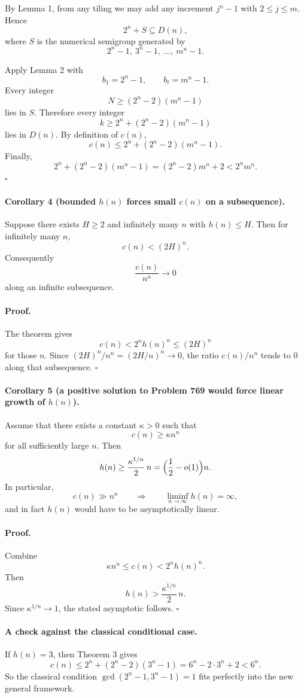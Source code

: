 By Lemma 1, from any tiling we may add any increment $j^n-1$ with $2\le j\le m$.
Hence
\[
2^n+S\subseteq D(n),
\]
where $S$ is the numerical semigroup generated by
\[
2^n-1,\ 3^n-1,\ \dots,\ m^n-1.
\]

Apply Lemma 2 with
\[
b_1=2^n-1,\qquad b_t=m^n-1.
\]
Every integer
\[
N\ge (2^n-2)(m^n-1)
\]
lies in $S$.
Therefore every integer
\[
k\ge 2^n+(2^n-2)(m^n-1)
\]
lies in $D(n)$.
By definition of $c(n)$,
\[
c(n)\le 2^n+(2^n-2)(m^n-1).
\]
Finally,
\[
2^n+(2^n-2)(m^n-1)
=
(2^n-2)m^n+2
<
2^n m^n.
\]
\hfill$\square$

\paragraph{Corollary 4 (bounded $h(n)$ forces small $c(n)$ on a subsequence).}
Suppose there exists $H\ge 2$ and infinitely many $n$ with $h(n)\le H$.
Then for infinitely many $n$,
\[
c(n)<(2H)^n.
\]
Consequently
\[
\frac{c(n)}{n^n}\to 0
\]
along an infinite subsequence.

\paragraph{Proof.}
The theorem gives
\[
c(n)<2^n h(n)^n\le (2H)^n
\]
for those $n$.
Since $(2H)^n/n^n=(2H/n)^n\to 0$, the ratio $c(n)/n^n$ tends to $0$ along that subsequence.
\hfill$\square$

\paragraph{Corollary 5 (a positive solution to Problem 769 would force linear growth of $h(n)$).}
Assume that there exists a constant $\kappa>0$ such that
\[
c(n)\ge \kappa n^n
\]
for all sufficiently large $n$.
Then
\[
h(n)\ge \frac{\kappa^{1/n}}{2}\,n
=
\Bigl(\frac12-o(1)\Bigr)n.
\]
In particular,
\[
c(n)\gg n^n
\qquad\Longrightarrow\qquad
\liminf_{n\to\infty} h(n)=\infty,
\]
and in fact $h(n)$ would have to be asymptotically linear.

\paragraph{Proof.}
Combine
\[
\kappa n^n\le c(n)<2^n h(n)^n.
\]
Then
\[
h(n)>\frac{\kappa^{1/n}}{2}\,n.
\]
Since $\kappa^{1/n}\to 1$, the stated asymptotic follows.
\hfill$\square$

\paragraph{A check against the classical conditional case.}
If $h(n)=3$, then Theorem 3 gives
\[
c(n)\le 2^n+(2^n-2)(3^n-1)=6^n-2\cdot 3^n+2<6^n.
\]
So the classical condition $\gcd(2^n-1,3^n-1)=1$ fits perfectly into the new general framework.

